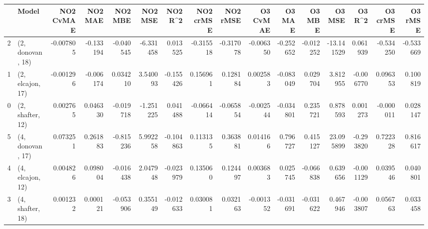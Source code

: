 \begin{tabular}{llrrrrrrrrrrrrrr}
\toprule
{} &             Model &  NO2 CvMAE &   NO2 MAE &   NO2 MBE &   NO2 MSE &   NO2 R\textasciicircum2 &  NO2 crMSE &  NO2 rMSE &  O3 CvMAE &    O3 MAE &    O3 MBE &     O3 MSE &    O3 R\textasciicircum2 &  O3 crMSE &   O3 rMSE \\
\midrule
2 &  (2, donovan, 18) &  -0.007805 & -0.133194 & -0.040545 & -6.331458 &  0.013525 &  -0.315518 & -0.317078 & -0.006350 & -0.252652 & -0.012252 & -13.141529 &  0.061939 & -0.534250 & -0.533669 \\
1 &  (2, elcajon, 17) &  -0.001296 & -0.006174 &  0.034210 &  3.540093 & -0.155426 &   0.156961 &  0.128184 &  0.002583 & -0.083049 &  0.029704 &   3.812955 & -0.006770 &  0.096353 &  0.100819 \\
0 &  (2, shafter, 12) &   0.002765 &  0.046330 & -0.019718 & -1.251225 &  0.041488 &  -0.066414 & -0.065854 & -0.002544 & -0.034801 &  0.235721 &   0.878593 &  0.001273 & -0.000011 &  0.028147 \\
5 &  (4, donovan, 17) &   0.073251 &  0.261883 & -0.815236 &  5.992258 & -0.104863 &   0.113135 &  0.363881 &  0.014166 &  0.796727 &  0.415127 &  23.095899 & -0.293820 &  0.722328 &  0.816617 \\
4 &  (4, elcajon, 12) &   0.004826 &  0.098004 & -0.016438 &  2.047948 & -0.023979 &   0.135060 &  0.124497 &  0.003683 &  0.025745 & -0.066838 &   0.639656 & -0.001129 &  0.039546 &  0.040801 \\
3 &  (4, shafter, 18) &   0.001232 &  0.000121 & -0.053906 &  0.355149 & -0.012633 &   0.030081 &  0.032163 & -0.001352 & -0.031691 & -0.031622 &   0.467946 & -0.003807 &  0.056763 &  0.033458 \\
\bottomrule
\end{tabular}

